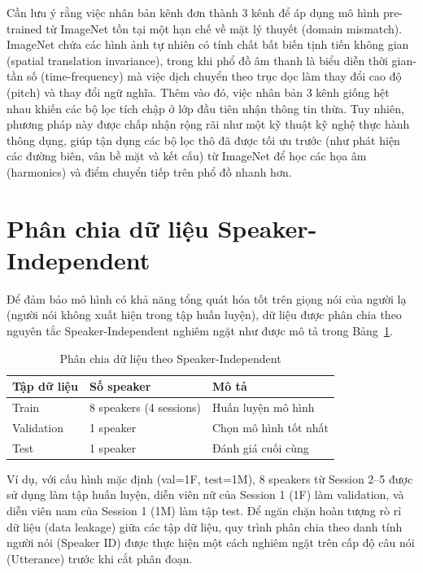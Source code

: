 Cần lưu ý rằng việc nhân bản kênh đơn thành 3 kênh để áp dụng mô hình pre-trained từ ImageNet tồn tại một hạn chế về mặt lý thuyết (domain mismatch). ImageNet chứa các hình ảnh tự nhiên có tính chất bất biến tịnh tiến không gian (spatial translation invariance), trong khi phổ đồ âm thanh là biểu diễn thời gian-tần số (time-frequency) mà việc dịch chuyển theo trục dọc làm thay đổi cao độ (pitch) và thay đổi ngữ nghĩa. Thêm vào đó, việc nhân bản 3 kênh giống hệt nhau khiến các bộ lọc tích chập ở lớp đầu tiên nhận thông tin thừa. Tuy nhiên, phương pháp này được chấp nhận rộng rãi như một kỹ thuật kỹ nghệ thực hành thông dụng, giúp tận dụng các bộ lọc thô đã được tối ưu trước (như phát hiện các đường biên, vân bề mặt và kết cấu) từ ImageNet để học các họa âm (harmonics) và điểm chuyển tiếp trên phổ đồ nhanh hơn.


\section{Phân chia dữ liệu Speaker-Independent}
\label{sec:speaker_independent}

Để đảm bảo mô hình có khả năng tổng quát hóa tốt trên giọng nói của người lạ (người nói không xuất hiện trong tập huấn luyện), dữ liệu được phân chia theo nguyên tắc Speaker-Independent nghiêm ngặt như được mô tả trong Bảng~\ref{tab:speaker_split}.

\begin{table}[H]
\centering
\caption{Phân chia dữ liệu theo Speaker-Independent}
\label{tab:speaker_split}
\begin{tabular}{lll}
\toprule
\textbf{Tập dữ liệu} & \textbf{Số speaker} & \textbf{Mô tả} \\
\midrule
Train & 8 speakers (4 sessions) & Huấn luyện mô hình \\
Validation & 1 speaker & Chọn mô hình tốt nhất \\
Test & 1 speaker & Đánh giá cuối cùng \\
\bottomrule
\end{tabular}
\end{table}

Ví dụ, với cấu hình mặc định (val=1F, test=1M), 8 speakers từ Session 2--5 được sử dụng làm tập huấn luyện, diễn viên nữ của Session 1 (1F) làm validation, và diễn viên nam của Session 1 (1M) làm tập test. Để ngăn chặn hoàn tượng rò rỉ dữ liệu (data leakage) giữa các tập dữ liệu, quy trình phân chia theo danh tính người nói (Speaker ID) được thực hiện một cách nghiêm ngặt trên cấp độ câu nói (Utterance) trước khi cắt phân đoạn.

